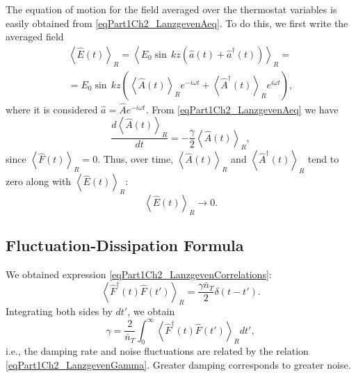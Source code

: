 The equation of motion for the field averaged over the thermostat variables is easily obtained from \eqref{eqPart1Ch2_LanzgevenAeq}. To do this, we first write the averaged field
\begin{eqnarray}
\left<\hat{E}\left(t\right)\right>_R 
= \left< E_0 \sin\,kz \left( \hat{a}\left(t\right) +
\hat{a}^{\dag}\left(t\right)\right)\right>_R  = 
\nonumber \\
= E_0 \sin\,kz
\left(\left<\hat{A}\left(t\right)\right>_R e^{-i \omega t}
+
\left<\hat{A}^{\dag}\left(t\right)\right>_R e^{i \omega t}
\right),
\nonumber
\end{eqnarray}
where it is considered $\hat{a} = \hat{A}e^{-i \omega t}$. From
\eqref{eqPart1Ch2_LanzgevenAeq} we have 
\begin{equation}
\frac{d \left<\hat{A}\left(t\right)\right>_R}{d t} = 
- \frac{\gamma}{2} \left<\hat{A}\left(t\right)\right>_R,
\nonumber
\end{equation}
since $\left<\hat{F}\left(t\right)\right>_R = 0$. Thus, over time, $\left<\hat{A}\left(t\right)\right>_R$ and
$\left<\hat{A}^{\dag}\left(t\right)\right>_R$ tend to zero along with  
$\left<\hat{E}\left(t\right)\right>_R$:
\begin{equation}
\left<\hat{E}\left(t\right)\right>_R \rightarrow 0.
\nonumber
\end{equation}

\subsection{Fluctuation-Dissipation Formula}
We obtained expression \eqref{eqPart1Ch2_LanzgevenCorrelations}:
\begin{equation}
\left<\hat{F}^{\dag}\left(t\right)\hat{F}\left(t'\right)\right>_R = 
\frac{\gamma \bar{n}_{T}}{2} \delta\left(t - t'\right).
\nonumber
\end{equation}
Integrating both sides by $d t'$, we obtain
\begin{equation}
\gamma =
\frac{2}{\bar{n}_T}\int_0^{\infty}\left<\hat{F}^{\dag}\left(t\right)\hat{F}\left(t'\right)\right>_R
d t',
\label{eqPart1Ch2_LanzgevenGamma}
\end{equation}
i.e., the damping rate and noise fluctuations are related by the relation \eqref{eqPart1Ch2_LanzgevenGamma}. Greater damping corresponds to greater noise.